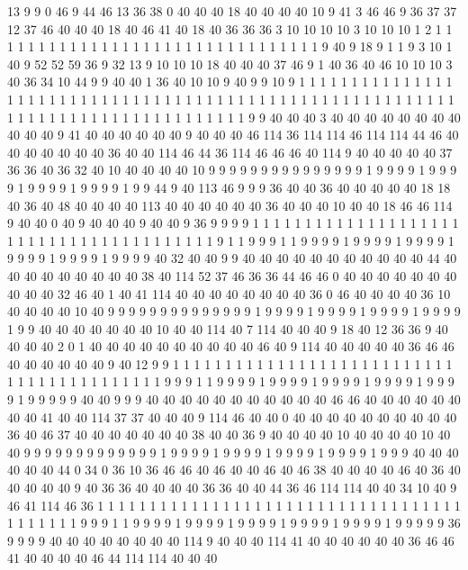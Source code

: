 13 9 9 0 46 9 44 46 13 36 38 0 40 40 40 18 40 40 40 40
10 9 41 3 46 46 9 36 37 37 12 37 46 40 40 40 18 40 46 41
40 18 40 36 36 36 3 10 10 10 10 3 10 10 10 1 2 1 1 1
1 1 1 1 1 1 1 1 1 1 1 1 1 1 1 1 1 1 1 1
1 1 1 1 1 1 1 1 1 9 40 9 18 9 1 1 9 3 10 1
40 9 52 52 59 36 9 32 13 9 10 10 10 18 40 40 40 37 46 9
1 40 36 40 46 10 10 10 3 40 36 34 10 44 9 9 40 40 1 36
40 10 10 9 40 9 9 10 9 1 1 1 1 1 1 1 1 1 1 1
1 1 1 1 1 1 1 1 1 1 1 1 1 1 1 1 1 1 1 1
1 1 1 1 1 1 1 1 1 1 1 1 1 1 1 1 1 1 1 1
1 1 1 1 1 1 1 1 1 1 1 1 1 1 1 1 1 1 1 1
1 1 1 1 1 1 1 1 1 1 9 9 40 40 40 3 40 40 40 40
40 40 40 40 40 40 40 9 41 40 40 40 40 40 40 9 40 40 40 46
114 36 114 114 46 114 114 44 46 40 40 40 40 40 40 40 36 40 40 114
46 44 36 114 46 46 46 40 114 9 40 40 40 40 40 37 36 36 40 36
32 40 10 40 40 40 40 10 9 9 9 9 9 9 9 9 9 9 9 9
9 9 9 1 9 9 9 9 1 9 9 9 9 1 9 9 9 9 1 9
9 9 9 1 9 9 44 9 40 113 46 9 9 9 36 40 40 36 40 40
40 40 40 18 18 40 36 40 48 40 40 40 40 113 40 40 40 40 40 40
36 40 40 40 10 40 40 18 46 46 114 9 40 40 0 40 9 40 40 40
9 40 40 9 36 9 9 9 9 1 1 1 1 1 1 1 1 1 1 1
1 1 1 1 1 1 1 1 1 1 1 1 1 1 1 1 1 1 1 1
1 1 1 1 1 1 1 1 1 9 1 1 9 9 9 1 1 9 9 9
9 1 9 9 9 9 1 9 9 9 9 1 9 9 9 9 1 9 9 9
9 1 9 9 9 9 40 32 40 40 9 9 40 40 40 40 40 40 40 40
40 40 40 44 40 40 40 40 40 40 40 40 40 38 40 114 52 37 46 36
36 44 46 46 0 40 40 40 40 40 40 40 40 40 40 32 46 40 1 40
41 114 40 40 40 40 40 40 40 40 36 0 46 40 40 40 40 36 10 40
40 40 40 10 40 9 9 9 9 9 9 9 9 9 9 9 9 9 9 1
9 9 9 9 1 9 9 9 9 1 9 9 9 9 1 9 9 9 9 1
9 9 40 40 40 40 40 40 40 10 40 40 114 40 7 114 40 40 40 9
18 40 12 36 36 9 40 40 40 40 2 0 1 40 40 40 40 40 40 40
40 40 40 46 40 9 114 40 40 40 40 40 36 46 46 40 40 40 40 40
40 9 40 12 9 9 1 1 1 1 1 1 1 1 1 1 1 1 1 1
1 1 1 1 1 1 1 1 1 1 1 1 1 1 1 1 1 1 1 1
1 1 1 1 1 1 1 1 9 9 9 1 1 9 9 9 9 1 9 9
9 9 1 9 9 9 9 1 9 9 9 9 1 9 9 9 9 1 9 9
9 9 9 40 40 9 9 9 40 40 40 40 40 40 40 40 40 40 40 46
46 40 40 40 40 40 40 40 40 41 40 40 114 37 37 40 40 40 9 114
46 40 40 0 40 40 40 40 40 40 40 40 40 40 36 40 46 37 40 40
40 40 40 40 40 38 40 40 36 9 40 40 40 40 10 40 40 40 40 10
40 40 9 9 9 9 9 9 9 9 9 9 9 9 9 1 9 9 9 9
1 9 9 9 9 1 9 9 9 9 1 9 9 9 9 1 9 9 9 40
40 40 40 40 40 44 0 34 0 36 10 36 46 46 40 46 40 40 46 40
46 38 40 40 40 40 46 40 36 40 40 40 40 40 9 40 36 36 40 40
40 40 36 36 40 40 44 36 46 114 114 40 40 34 10 40 9 46 41 114
46 36 1 1 1 1 1 1 1 1 1 1 1 1 1 1 1 1 1 1
1 1 1 1 1 1 1 1 1 1 1 1 1 1 1 1 1 1 1 1
1 1 1 1 9 9 9 1 1 9 9 9 9 1 9 9 9 9 1 9
9 9 9 1 9 9 9 9 1 9 9 9 9 1 9 9 9 9 9 36
9 9 9 9 40 40 40 40 40 40 40 40 114 9 40 40 40 114 41 40
40 40 40 40 40 36 46 46 41 40 40 40 40 46 44 114 114 40 40 40
